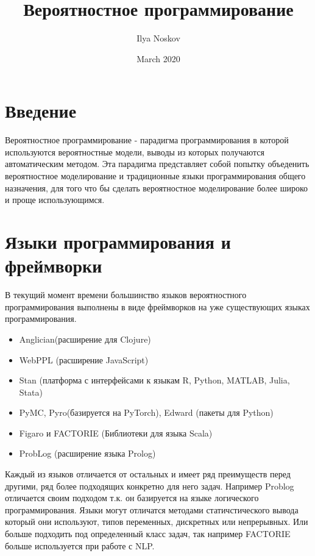 \documentclass{article}
\title{Вероятностное программирование}
\author{Ilya Noskov }
\date{March 2020}
\begin{document}
\maketitle

\section{Введение}
Вероятностное программирование - парадигма программирования в которой используются вероятностные модели, выводы из которых получаются автоматическим методом. Эта парадигма представляет собой попытку объеденить вероятностное моделирование и традиционные языки программирования общего назначения, для того что бы сделать вероятностное моделирование более широко и проще использующимся.
\section{Языки программирования и фреймворки}
В текущий момент времени большинство языков вероятностного программирования выполнены в виде фреймворков на уже существующих языках программирования. 
\begin{itemize}
  \item Anglician(расширение для Clojure)
  \item WebPPL (расширение JavaScript)
  \item Stan (платформа с интерфейсами к языкам R, Python, MATLAB, Julia, Stata)
  \item PyMC, Pyro(базируется на PyTorch), Edward (пакеты для Python)
  \item Figaro и FACTORIE (Библиотеки для языка Scala)
  \item ProbLog (расширение языка Prolog)
\end{itemize}
Каждый из языков отличается от остальных и имеет ряд преимуществ перед другими, ряд более подходящих конкретно для него задач. Например Problog отличается своим подходом т.к. он базируется на языке логического программирования. Языки могут отличатся методами статичстического вывода который они используют, типов переменных, дискретных или непрерывных. Или больше подходить под определенный класс задач, так например FACTORIE больше используется при работе с NLP. 
\end{document}
